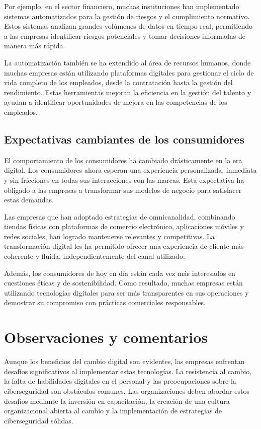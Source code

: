\documentclass[letterpaper,12pt]{article}
\begin{document}
Por ejemplo, en el sector financiero, muchas instituciones han implementado sistemas automatizados para la gestión de riesgos y el cumplimiento normativo. Estos sistemas analizan grandes volúmenes de datos en tiempo real, permitiendo a las empresas identificar riesgos potenciales y tomar decisiones informadas de manera más rápida.

La automatización también se ha extendido al área de recursos humanos, donde muchas empresas están utilizando plataformas digitales para gestionar el ciclo de vida completo de los empleados, desde la contratación hasta la gestión del rendimiento. Estas herramientas mejoran la eficiencia en la gestión del talento y ayudan a identificar oportunidades de mejora en las competencias de los empleados.

\subsection*{Expectativas cambiantes de los consumidores}
El comportamiento de los consumidores ha cambiado drásticamente en la era digital. Los consumidores ahora esperan una experiencia personalizada, inmediata y sin fricciones en todas sus interacciones con las marcas. Esta expectativa ha obligado a las empresas a transformar sus modelos de negocio para satisfacer estas demandas.

Las empresas que han adoptado estrategias de omnicanalidad, combinando tiendas físicas con plataformas de comercio electrónico, aplicaciones móviles y redes sociales, han logrado mantenerse relevantes y competitivas. La transformación digital les ha permitido ofrecer una experiencia de cliente más coherente y fluida, independientemente del canal utilizado.

Además, los consumidores de hoy en día están cada vez más interesados en cuestiones éticas y de sostenibilidad. Como resultado, muchas empresas están utilizando tecnologías digitales para ser más transparentes en sus operaciones y demostrar su compromiso con prácticas comerciales responsables.

\section*{Observaciones y comentarios}
Aunque los beneficios del cambio digital son evidentes, las empresas enfrentan desafíos significativos al implementar estas tecnologías. La resistencia al cambio, la falta de habilidades digitales en el personal y las preocupaciones sobre la ciberseguridad son obstáculos comunes. Las organizaciones deben abordar estos desafíos mediante la inversión en capacitación, la creación de una cultura organizacional abierta al cambio y la implementación de estrategias de ciberseguridad sólidas.
\end{document}
